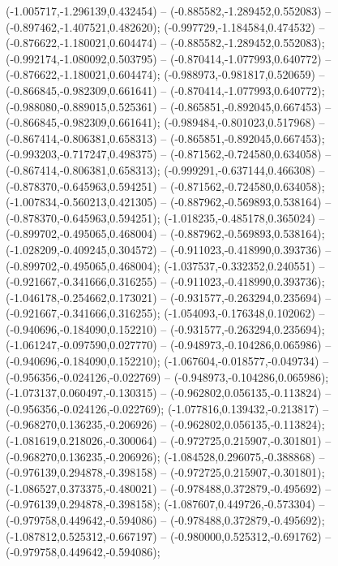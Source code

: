  (-1.005717,-1.296139,0.432454) -- (-0.885582,-1.289452,0.552083) -- (-0.897462,-1.407521,0.482620);
 (-0.997729,-1.184584,0.474532) -- (-0.876622,-1.180021,0.604474) -- (-0.885582,-1.289452,0.552083);
 (-0.992174,-1.080092,0.503795) -- (-0.870414,-1.077993,0.640772) -- (-0.876622,-1.180021,0.604474);
 (-0.988973,-0.981817,0.520659) -- (-0.866845,-0.982309,0.661641) -- (-0.870414,-1.077993,0.640772);
 (-0.988080,-0.889015,0.525361) -- (-0.865851,-0.892045,0.667453) -- (-0.866845,-0.982309,0.661641);
 (-0.989484,-0.801023,0.517968) -- (-0.867414,-0.806381,0.658313) -- (-0.865851,-0.892045,0.667453);
 (-0.993203,-0.717247,0.498375) -- (-0.871562,-0.724580,0.634058) -- (-0.867414,-0.806381,0.658313);
 (-0.999291,-0.637144,0.466308) -- (-0.878370,-0.645963,0.594251) -- (-0.871562,-0.724580,0.634058);
 (-1.007834,-0.560213,0.421305) -- (-0.887962,-0.569893,0.538164) -- (-0.878370,-0.645963,0.594251);
 (-1.018235,-0.485178,0.365024) -- (-0.899702,-0.495065,0.468004) -- (-0.887962,-0.569893,0.538164);
 (-1.028209,-0.409245,0.304572) -- (-0.911023,-0.418990,0.393736) -- (-0.899702,-0.495065,0.468004);
 (-1.037537,-0.332352,0.240551) -- (-0.921667,-0.341666,0.316255) -- (-0.911023,-0.418990,0.393736);
 (-1.046178,-0.254662,0.173021) -- (-0.931577,-0.263294,0.235694) -- (-0.921667,-0.341666,0.316255);
 (-1.054093,-0.176348,0.102062) -- (-0.940696,-0.184090,0.152210) -- (-0.931577,-0.263294,0.235694);
 (-1.061247,-0.097590,0.027770) -- (-0.948973,-0.104286,0.065986) -- (-0.940696,-0.184090,0.152210);
 (-1.067604,-0.018577,-0.049734) -- (-0.956356,-0.024126,-0.022769) -- (-0.948973,-0.104286,0.065986);
 (-1.073137,0.060497,-0.130315) -- (-0.962802,0.056135,-0.113824) -- (-0.956356,-0.024126,-0.022769);
 (-1.077816,0.139432,-0.213817) -- (-0.968270,0.136235,-0.206926) -- (-0.962802,0.056135,-0.113824);
 (-1.081619,0.218026,-0.300064) -- (-0.972725,0.215907,-0.301801) -- (-0.968270,0.136235,-0.206926);
 (-1.084528,0.296075,-0.388868) -- (-0.976139,0.294878,-0.398158) -- (-0.972725,0.215907,-0.301801);
 (-1.086527,0.373375,-0.480021) -- (-0.978488,0.372879,-0.495692) -- (-0.976139,0.294878,-0.398158);
 (-1.087607,0.449726,-0.573304) -- (-0.979758,0.449642,-0.594086) -- (-0.978488,0.372879,-0.495692);
 (-1.087812,0.525312,-0.667197) -- (-0.980000,0.525312,-0.691762) -- (-0.979758,0.449642,-0.594086);

